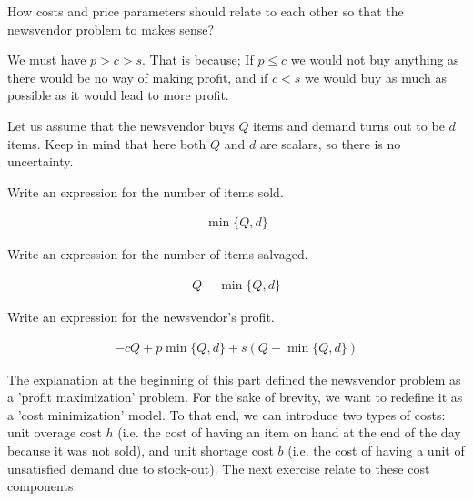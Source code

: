 \begin{question}
How costs and price parameters should relate to each other so that the newsvendor problem to makes sense?
\end{question}

\begin{solution}
We must have $p>c>s$. That is because; If $p\leq c$ we would not buy anything as there would be no way of making profit, and if $c<s$ we would buy as much as possible as it would lead to more profit. 
\end{solution}

Let us assume that the newsvendor buys $Q$ items and demand turns out to be $d$ items. Keep in mind that here both $Q$ and $d$ are scalars, so there is no uncertainty. 

\begin{question}
Write an expression for the number of items sold.
\end{question}

\begin{solution}
\begin{align*}
\min\{Q,d\}
\end{align*}
\end{solution}

\begin{question}
Write an expression for the number of items salvaged.
\end{question}

\begin{solution}
\begin{align*}
Q-\min\{Q,d\}
\end{align*}
\end{solution}

\begin{question}
Write an expression for the newsvendor's profit.
\end{question}

\begin{solution}
\begin{align*}
-cQ + p\min\{Q,d\} + s(Q-\min\{Q,d\}) 
\end{align*}
\end{solution}

The explanation at the beginning of this part defined the newsvendor problem as a 'profit maximization' problem. For the sake of brevity, we want to redefine it as a 'cost minimization' model. To that end, we can introduce two types of costs: unit overage cost $h$ (i.e. the cost of having an item on hand at the end of the day because it was not sold), and unit shortage cost $b$ (i.e. the cost of having a unit of unsatisfied demand due to stock-out). The next exercise relate to these cost components.

